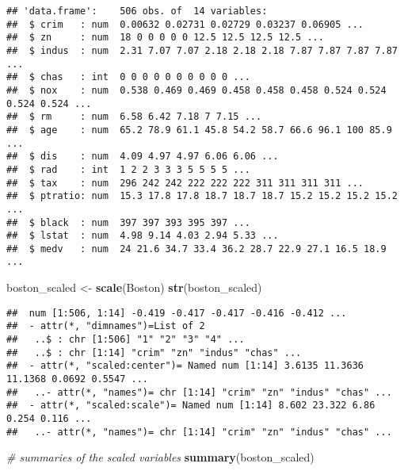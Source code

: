 \documentclass[
]{article}
\newenvironment{Shaded}{\begin{snugshade}}{\end{snugshade}}
\newcommand{\CommentTok}[1]{\textcolor[rgb]{0.56,0.35,0.01}{\textit{#1}}}
\newcommand{\KeywordTok}[1]{\textcolor[rgb]{0.13,0.29,0.53}{\textbf{#1}}}
\newcommand{\NormalTok}[1]{#1}
\newcommand{\StringTok}[1]{\textcolor[rgb]{0.31,0.60,0.02}{#1}}
\begin{document}
\begin{verbatim}
## 'data.frame':    506 obs. of  14 variables:
##  $ crim   : num  0.00632 0.02731 0.02729 0.03237 0.06905 ...
##  $ zn     : num  18 0 0 0 0 0 12.5 12.5 12.5 12.5 ...
##  $ indus  : num  2.31 7.07 7.07 2.18 2.18 2.18 7.87 7.87 7.87 7.87 ...
##  $ chas   : int  0 0 0 0 0 0 0 0 0 0 ...
##  $ nox    : num  0.538 0.469 0.469 0.458 0.458 0.458 0.524 0.524 0.524 0.524 ...
##  $ rm     : num  6.58 6.42 7.18 7 7.15 ...
##  $ age    : num  65.2 78.9 61.1 45.8 54.2 58.7 66.6 96.1 100 85.9 ...
##  $ dis    : num  4.09 4.97 4.97 6.06 6.06 ...
##  $ rad    : int  1 2 2 3 3 3 5 5 5 5 ...
##  $ tax    : num  296 242 242 222 222 222 311 311 311 311 ...
##  $ ptratio: num  15.3 17.8 17.8 18.7 18.7 18.7 15.2 15.2 15.2 15.2 ...
##  $ black  : num  397 397 393 395 397 ...
##  $ lstat  : num  4.98 9.14 4.03 2.94 5.33 ...
##  $ medv   : num  24 21.6 34.7 33.4 36.2 28.7 22.9 27.1 16.5 18.9 ...
\end{verbatim}

\begin{Shaded}
\begin{Highlighting}[]
\NormalTok{boston_scaled <-}\StringTok{ }\KeywordTok{scale}\NormalTok{(Boston)}
\KeywordTok{str}\NormalTok{(boston_scaled)}
\end{Highlighting}
\end{Shaded}

\begin{verbatim}
##  num [1:506, 1:14] -0.419 -0.417 -0.417 -0.416 -0.412 ...
##  - attr(*, "dimnames")=List of 2
##   ..$ : chr [1:506] "1" "2" "3" "4" ...
##   ..$ : chr [1:14] "crim" "zn" "indus" "chas" ...
##  - attr(*, "scaled:center")= Named num [1:14] 3.6135 11.3636 11.1368 0.0692 0.5547 ...
##   ..- attr(*, "names")= chr [1:14] "crim" "zn" "indus" "chas" ...
##  - attr(*, "scaled:scale")= Named num [1:14] 8.602 23.322 6.86 0.254 0.116 ...
##   ..- attr(*, "names")= chr [1:14] "crim" "zn" "indus" "chas" ...
\end{verbatim}

\begin{Shaded}
\begin{Highlighting}[]
\CommentTok{# summaries of the scaled variables}
\KeywordTok{summary}\NormalTok{(boston_scaled)}
\end{Highlighting}
\end{Shaded}
\end{document}
